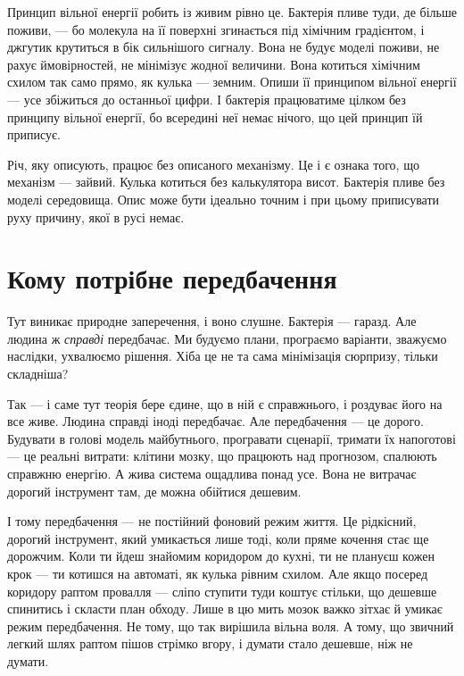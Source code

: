 \documentclass[12pt, a4paper, openany]{book}
\begin{document}
Принцип вільної енергії робить із живим рівно це. Бактерія пливе туди, де більше поживи, --- бо молекула на її поверхні згинається під хімічним градієнтом, і джгутик крутиться в бік сильнішого сигналу. Вона не будує моделі поживи, не рахує ймовірностей, не мінімізує жодної величини. Вона котиться хімічним схилом так само прямо, як кулька --- земним. Опиши її принципом вільної енергії --- усе збіжиться до останньої цифри. І бактерія працюватиме цілком без принципу вільної енергії, бо всередині неї немає нічого, що цей принцип їй приписує.

\begin{analogybox}
Річ, яку описують, працює без описаного механізму. Це і є ознака того, що механізм --- зайвий. Кулька котиться без калькулятора висот. Бактерія пливе без моделі середовища. Опис може бути ідеально точним і при цьому приписувати руху причину, якої в русі немає.
\end{analogybox}

\section{Кому потрібне передбачення}

Тут виникає природне заперечення, і воно слушне. Бактерія --- гаразд. Але людина ж \emph{справді} передбачає. Ми будуємо плани, програємо варіанти, зважуємо наслідки, ухвалюємо рішення. Хіба це не та сама мінімізація сюрпризу, тільки складніша?

Так --- і саме тут теорія бере єдине, що в ній є справжнього, і роздуває його на все живе. Людина справді іноді передбачає. Але передбачення --- це дорого. Будувати в голові модель майбутнього, програвати сценарії, тримати їх напоготові --- це реальні витрати: клітини мозку, що працюють над прогнозом, спалюють справжню енергію. А жива система ощадлива понад усе. Вона не витрачає дорогий інструмент там, де можна обійтися дешевим.

І тому передбачення --- не постійний фоновий режим життя. Це рідкісний, дорогий інструмент, який умикається лише тоді, коли пряме кочення стає ще дорожчим. Коли ти йдеш знайомим коридором до кухні, ти не плануєш кожен крок --- ти котишся на автоматі, як кулька рівним схилом. Але якщо посеред коридору раптом провалля --- сліпо ступити туди коштує стільки, що дешевше спинитись і скласти план обходу. Лише в цю мить мозок важко зітхає й умикає режим передбачення. Не тому, що так вирішила вільна воля. А тому, що звичний легкий шлях раптом пішов стрімко вгору, і думати стало дешевше, ніж не думати.
\end{document}
